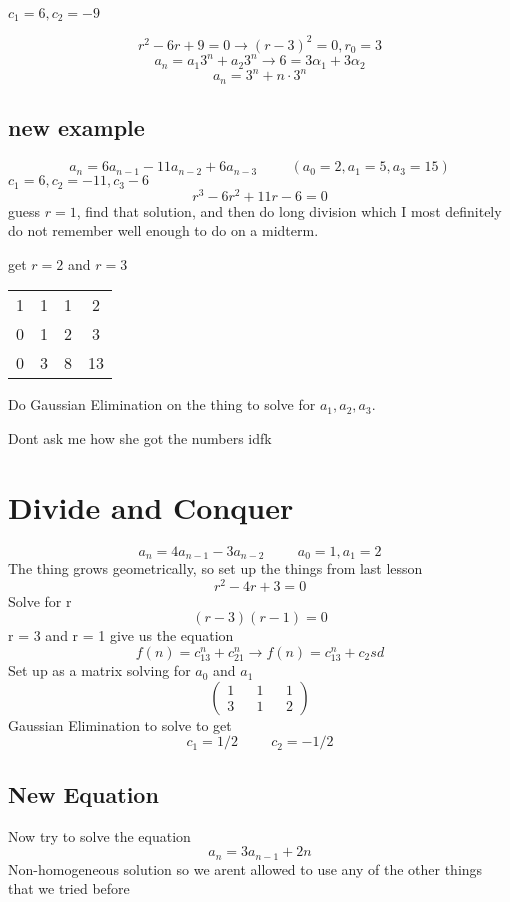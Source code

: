 \documentclass{report}
\begin{document}
$c_1 = 6, c_2 = -9$

\[
r^2 -6r + 9 = 0
\rightarrow
(r-3)^2 = 0, r_0 = 3
\]
\[
a_n = a_1 3^n + a_2 3^n
\rightarrow
6 = 3 \alpha_1 + 3\alpha_2
\]
\[
a_n = 3^n + n\cdot 3^n
\]


\section{new example}
\[
a_n = 
6a_{n-1}
- 11a_{n-2}
+
6a_{n-3}
\hspace{1cm}
(a_0 = 2,a_1 =5, a_3 = 15)
\]
$c_1 = 6, c_2 = -11, c_3 - 6$
\[
r^3 - 6r^2 + 11r - 6 = 0
\]
guess $r = 1$, find that solution, and then do long division which I most definitely do not remember well enough to do on a midterm.

get $r=2$ and $r=3$

\begin{tabular}{c c c | c}
1 & 1 & 1 & 2 \\ 
0 & 1 & 2 & 3 \\
0 & 3 & 8 & 13
\end{tabular}

Do Gaussian Elimination on the thing to solve for $a_1, a_2, a_3$.

Dont ask me how she got the numbers idfk


\chapter{Divide and Conquer}
\[
a_n = 4a_{n-1} - 3a_{n-2}
\hspace{1cm}
a_0 = 1, a_1 = 2
\]
The thing grows geometrically, so set up the things from last lesson
\[
r^2 - 4r + 3 = 0
\]
Solve for r
\[
(r-3)(r-1) = 0
\]
r = 3 and r = 1 give us the equation
\[
f(n) = c_13^n + c_21^n
\rightarrow
f(n) = c_13^n + c_2sd
\]
Set up as a matrix solving for $a_0$ and $a_1$
\[
\begin{pmatrix}
1 && 1 && 1 \\
3 && 1 && 2
\end{pmatrix}
\]
Gaussian Elimination to solve to get
\[
c_1 = 1/2 
\hspace{1cm}
c_2 = -1/2
\]

\section{New Equation}
Now try to solve the equation
\[
a_n = 3a_{n-1} + 2n
\]
Non-homogeneous solution so we arent allowed to use any of the other things that we tried before
\end{document}
